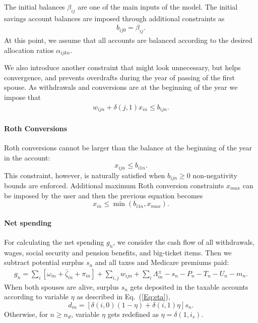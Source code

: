 \documentclass{report}[fleqn,11pt]
\begin{document}
	The initial balances $\beta_{ij}$ are one of the main inputs of the model.
	The initial savings account balances are imposed through additional constraints as
	\begin{eqnarray}
		\label{Eq:InitialBalance}
		b_{ij0} = \beta_{ij}.
	\end{eqnarray}
	At this point, we assume that all accounts are balanced according to the desired
	allocation ratios $\alpha_{ijkn}$.

	We also introduce another constraint that might look unnecessary, but helps
	convergence, and prevents overdrafts during the year of passing of the first spouse.
	As withdrawals and conversions are at the beginning of the year 
	we impose that
	\begin{eqnarray}
		w_{ijn} + \delta(j, 1)x_{in} \le b_{ijn}.
	\end{eqnarray}

\paragraph*{Roth Conversions}
	Roth conversions cannot be larger than the balance at the beginning of the year in the account:
	\begin{equation}
		x_{ijn} \le b_{i1n}.
	\end{equation}
	This constraint, however, is naturally satisfied when $b_{ijn} \ge 0$ non-negativity bounds are enforced.
	Additional maximum Roth conversion constraints $x_{max}$ can be imposed by the user and
	then the previous equation becomes
	\begin{equation}
		x_{in} \le \min(b_{i1n}, x_{max}).
	\end{equation}

\paragraph*{Net spending}
	For calculating the net spending $g_n$, we consider the cash flow of all withdrawals,
	wages, social security and pension benefits, and big-ticket items. 
	Then we subtract potential surplus $s_{n}$ and all taxes and Medicare premiums paid:
	\begin{eqnarray}
		g_n = \sum_i [\omega_{in} + \bar{\zeta}_{in} + \pi_{in} ] 
		+ \sum_{i,j} w_{ijn} + \sum_i \Lambda^\pm_{in} - s_{n}
		- P_n - T_n - U_n - m_n.
	\end{eqnarray}
	When both spouses are alive, surplus $s_n$ gets deposited in the taxable accounts
	according to variable $\eta$ as described in Eq.~(\ref{Eq:eta}),
	\begin{equation}
		\label{Eq:eta2}
		d_{in} = [\delta(i, 0)(1 - \eta) + \delta(i, 1)\eta] s_n .
	\end{equation}
	Otherwise, for $n \ge n_d$, variable $\eta$ gets redefined as $\eta = \delta(1, i_s)$.
\end{document}
